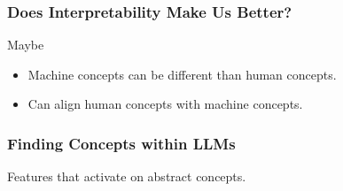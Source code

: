 \subsubsection{Does Interpretability Make Us Better?}
\begin{notes}
    Maybe
    \begin{itemize}
        \item Machine concepts can be different than human concepts. 
        \item Can align human concepts with machine concepts.
    \end{itemize}
\end{notes}

\subsubsection{Finding Concepts within LLMs}
\begin{example} Features that activate on abstract concepts. 
\end{example}
